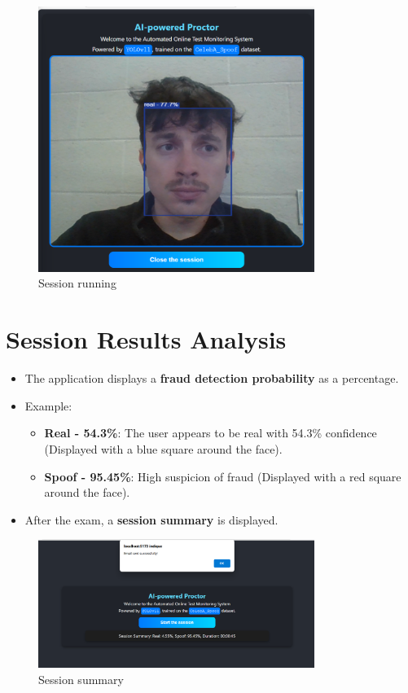 \documentclass[a4paper,12pt]{article}
\begin{document}
\begin{figure}[h!]
    \centering
    \includegraphics[width=0.8\textwidth]{IMG/session.png}
    \caption{Session running}
    \label{fig:welcome_screen}
\end{figure}

\section{Session Results Analysis}
\begin{itemize}
    \item The application displays a \textbf{fraud detection probability} as a percentage.
    \item Example:
    \begin{itemize}
        \item \textbf{Real - 54.3\%}: The user appears to be real with 54.3\% confidence (Displayed with a blue square around the face).
        \item \textbf{Spoof - 95.45\%}: High suspicion of fraud (Displayed with a red square around the face).
    \end{itemize}
    \item After the exam, a \textbf{session summary} is displayed.
\end{itemize}

\begin{figure}[h!]
    \centering
    \includegraphics[width=0.8\textwidth]{IMG/session_end.png}
    \caption{Session summary}
    \label{fig:welcome_screen}
\end{figure}
\end{document}
